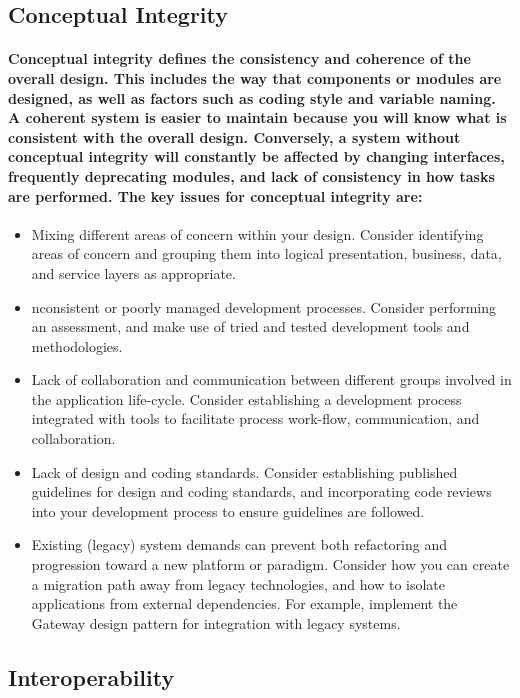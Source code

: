 \documentclass[../Psychological_system_web_application.tex]{subfiles}
\begin{document}
			\subsection{Conceptual Integrity}
				\paragraph{\gls{Conceptual integrity} defines the consistency and coherence of the overall design. This includes the way that components or modules are designed, as well as factors such as coding style and variable naming. A coherent system is easier to maintain because you will know what is consistent with the overall design. Conversely, a system without conceptual integrity will constantly be affected by changing interfaces, frequently deprecating modules, and lack of consistency in how tasks are performed. The key issues for conceptual integrity are:}
				
				\begin{itemize}
					\item
						Mixing different areas of concern within your design. Consider identifying areas of concern and grouping them into logical presentation, business, data, and service layers as appropriate.
					\item
						nconsistent or poorly managed development processes. Consider performing an  assessment, and make use of tried and tested development tools and methodologies.
					\item
						Lack of collaboration and communication between different groups involved in the application life-cycle. Consider establishing a development process integrated with tools to facilitate process work-flow, communication, and collaboration.
					\item
						Lack of design and coding standards. Consider establishing published guidelines for design and coding standards, and incorporating code reviews into your development process to ensure guidelines are followed.
					\item
						Existing (legacy) system demands can prevent both refactoring and progression toward a new platform or paradigm. Consider how you can create a migration path away from legacy technologies, and how to isolate applications from external dependencies. For example, implement the Gateway design pattern for integration with legacy systems.
				\end{itemize}
			
			\subsection{Interoperability}
\end{document}

